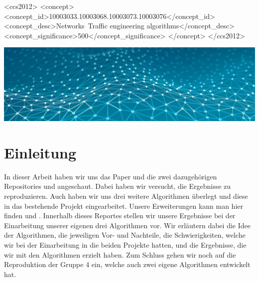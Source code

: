 \documentclass[sigconf,nonacm,review,language=english,language=german]{acmart}
\begin{document}
\begin{CCSXML}
<ccs2012>
<concept>
<concept_id>10003033.10003068.10003073.10003076</concept_id>
<concept_desc>Networks~Traffic engineering algorithms</concept_desc>
<concept_significance>500</concept_significance>
</concept>
</ccs2012>
\end{CCSXML}



\begin{teaserfigure}
  \includegraphics[width=\textwidth]{Grafiken/netzwerk.jpeg}
  \label{fig:network}
\end{teaserfigure}

\maketitle

\section{Einleitung}
    In dieser Arbeit haben wir uns das Paper \cite{parham2021traffic} und die zwei dazugehörigen Repositories \cite{original_p1} und \cite{original_p2} angeschaut. Dabei haben wir versucht, die Ergebnisse zu reproduzieren. Auch haben wir uns drei weitere Algorithmen überlegt und diese in das bestehende Projekt eingearbeitet. Unsere Erweiterungen kann man hier finden \cite{reproduktion_p1} und \cite{reproduktion_p2}.
    Innerhalb dieses Reportes stellen wir unsere Ergebnisse bei der Einarbeitung unserer eigenen drei Algorithmen vor. Wir erläutern dabei die Idee der Algorithmen, die jeweiligen Vor- und Nachteile, die Schwierigkeiten, welche wir bei der Einarbeitung in die beiden Projekte hatten, und die Ergebnisse, die wir mit den Algorithmen erzielt haben. Zum Schluss gehen wir noch auf die Reproduktion der Gruppe 4 ein, welche auch zwei eigene Algorithmen entwickelt hat. 
\end{document}
